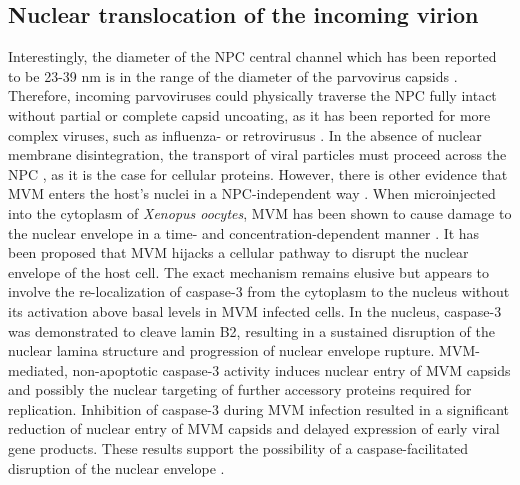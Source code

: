 \subsection{Nuclear translocation of the incoming virion}
Interestingly, the diameter of the NPC central channel which has been reported to be 23-39 nm \cite{pmid11854401, pmid2450095} is in the range of the diameter of the parvovirus capsids \cite{NPC}. Therefore, incoming parvoviruses could physically traverse the NPC fully intact without partial or complete capsid uncoating, as it has been reported for more complex viruses, such as influenza- or retrovirusus \cite{pmid10848617, pmid11389849, pmid8970960, pmid11031249, pmid9891810}. In the absence of nuclear membrane disintegration, the transport of viral particles must proceed across the NPC \cite{pmid10801463, pmid10395558, pmid11448991}, as it is the case for cellular proteins. However, there is other evidence that MVM enters the host's nuclei in a NPC-independent way \cite{pmid17030854}. When microinjected into the cytoplasm of \textit{Xenopus oocytes}, MVM has been shown to cause damage to the nuclear envelope in a time- and concentration-dependent manner \cite{pmid16298969}. It has been proposed that MVM hijacks a cellular pathway to disrupt the nuclear envelope of the host cell. The exact mechanism remains elusive but appears to involve the re-localization of caspase-3 from the cytoplasm to the nucleus without its activation above basal levels in MVM infected cells. In the nucleus, caspase-3 was demonstrated to cleave lamin B2, resulting in a sustained disruption of the nuclear lamina structure and progression of nuclear envelope rupture. MVM-mediated, non-apoptotic caspase-3 activity induces nuclear entry of MVM capsids and possibly the nuclear targeting of further accessory proteins required for replication. Inhibition of caspase-3 during MVM infection resulted in a significant reduction of nuclear entry of MVM capsids and delayed expression of early viral gene products. These results support the possibility of a caspase-facilitated disruption of the nuclear envelope \cite{pmid21367902}.  


